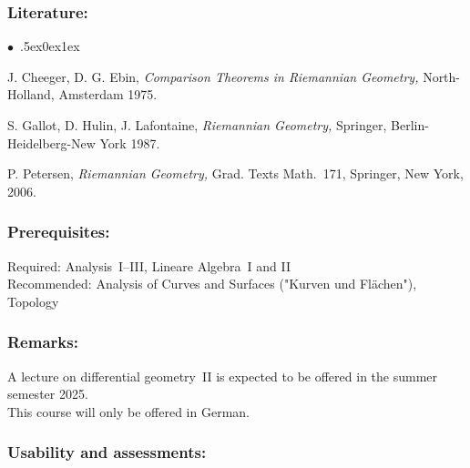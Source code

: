 \documentclass[a4paper,10pt]{article}
\renewenvironment{itemize}{\begin{list}{$\bullet$\ }{\itemsep.5ex\setlength{\topsep}{0.5\itemsep}\parsep0ex\labelsep1ex\settowidth{\labelwidth}{$\bullet$\ }\setlength{\leftmargin}{\labelwidth}\addtolength{\leftmargin}{3ex}\addtolength{\leftmargin}{\labelsep}}}{\end{list}}
\begin{document}
\subsubsection*{\large
    Literature:
}
\begin{itemize}
\item{J. Cheeger, D. G. Ebin, {\em Comparison Theorems in Riemannian Geometry,\/} North-Holland, Amsterdam 1975.}
\item{S. Gallot, D. Hulin, J. Lafontaine, {\em Riemannian Geometry,\/} Springer, Berlin-Heidelberg-New York 1987.}
\item{P. Petersen, {\em Riemannian Geometry,\/} Grad. Texts Math.~171, Springer, New York, 2006.}
\end{itemize}
\subsubsection*{\large
    Prerequisites:
}
Required: Analysis~I–III, Lineare Algebra~I and II \\
Recommended: Analysis of Curves and Surfaces ("Kurven und Flächen"), Topology
\subsubsection*{\large
    Remarks:
}
A lecture on differential geometry~II is expected to be offered in the summer semester 2025. \\
This course will only be offered in German.
\subsubsection*{\large
    Usability and assessments:
}
\end{document}
